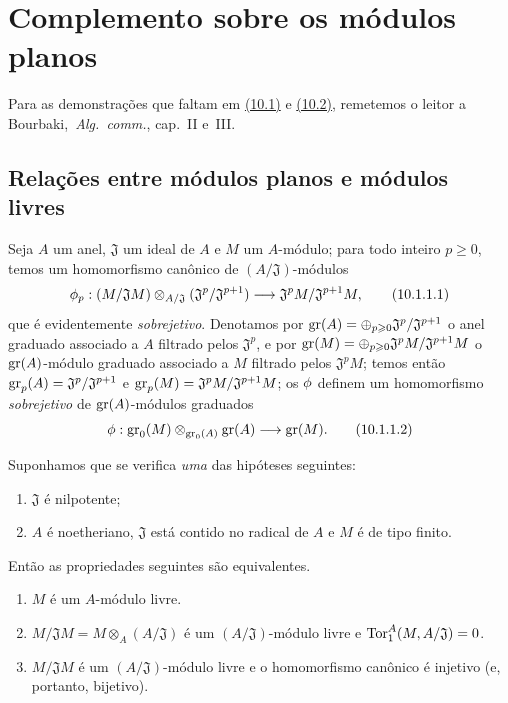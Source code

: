 \section{Complemento sobre os módulos planos}
\label{section:0.10}

Para as demonstrações que faltam em \hyperref[subsection:0.10.1]{(10.1)} e \hyperref[subsection:0.10.2]{(10.2)}, remetemos o leitor a Bourbaki,~\emph{Alg.~comm.}, cap.~II e~III.

\subsection{Relações entre módulos planos e módulos livres}
\label{subsection:0.10.1}

\begin{env}[10.1.1]
\label{0.10.1.1}
Seja $A$ um anel, $\mathfrak{J}$ um ideal de $A$ e $M$ um $A$-módulo;
para todo inteiro $p\geq0$, temos um homomorfismo canônico de $(A/\mathfrak{J})$-módulos
\[
\label{0.10.1.1.1}
  \vphi_p:(M/\mathfrak{J}M)\otimes_{A/\mathfrak{J}}(\mathfrak{J}^p/\mathfrak{J}^{p+1})\to\mathfrak{J}^pM/\mathfrak{J}^{p+1}M,
  \tag{10.1.1.1}
\]
que é evidentemente \emph{sobrejetivo}.
Denotamos por $\operatorname{gr}(A)=\oplus_{p\geqslant0}\mathfrak{J}^p/\mathfrak{J}^{p+1}$ o anel graduado associado a $A$ filtrado pelos $\mathfrak{J}^p$, e por $\operatorname{gr}(M)=\oplus_{p\geqslant0}\mathfrak{J}^pM/\mathfrak{J}^{p+1}M$ o $\operatorname{gr}(A)$-módulo graduado associado a $M$ filtrado pelos $\mathfrak{J}^pM$;
temos então $\operatorname{gr}_p(A)=\mathfrak{J}^p/\mathfrak{J}^{p+1}$ e $\operatorname{gr}_p(M)=\mathfrak{J}^pM/\mathfrak{J}^{p+1}M$;
os $\phi$ definem um homomorfismo \emph{sobrejetivo} de $\operatorname{gr}(A)$-módulos graduados
\[
\label{0.10.1.1.2}
  \vphi:\gr_0(M)\otimes_{\gr_0(A)}\gr(A)\to\gr(M).
  \tag{10.1.1.2}
\]
\end{env}

\begin{env}[10.1.2]
\label{0.10.1.2}
Suponhamos que se verifica \emph{uma} das hipóteses seguintes:
\begin{enumerate}
  \item[(i)] $\mathfrak{J}$ é nilpotente;
  \item[(ii)] $A$ é noetheriano, $\mathfrak{J}$ está contido no radical de $A$ e $M$ é de tipo finito.
\end{enumerate}
Então as propriedades seguintes são equivalentes.
\begin{enumerate}
  \item[(a)] $M$ é um $A$-módulo livre.
  \item[(b)] $M/\mathfrak{J}M=M\otimes_A(A/\mathfrak{J})$ é um $(A/\mathfrak{J})$-módulo livre e $\operatorname{Tor}_1^A(M,A/\mathfrak{J})=0$.
  \item[(c)] $M/\mathfrak{J}M$ é um $(A/\mathfrak{J})$-módulo livre e o homomorfismo canônico  é injetivo (e, portanto, bijetivo).
\end{enumerate}
\end{env}

